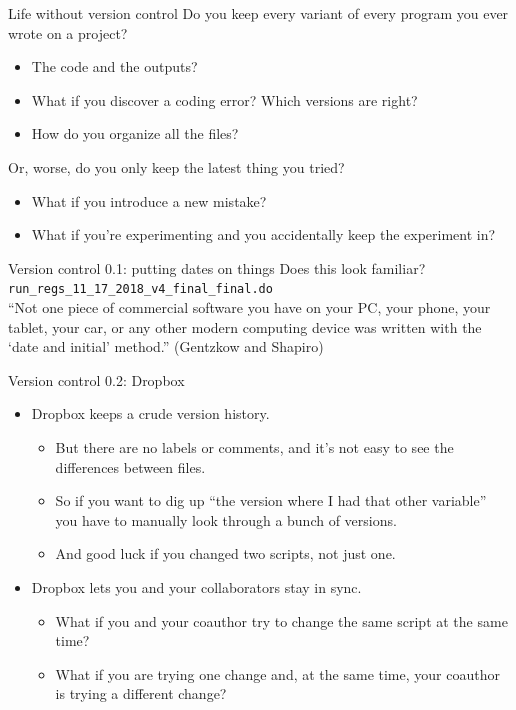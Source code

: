 \documentclass{beamer}
\begin{document}
\begin{frame}{Life without version control}
Do you keep every variant of every program you ever wrote on a project?
\begin{itemize}
\item The code and the outputs?
\item What if you discover a coding error? Which versions are right?
\item How do you organize all the files?
\end{itemize}
Or, worse, do you only keep the latest thing you tried?
\begin{itemize}
\item What if you introduce a new mistake?
\item What if you're experimenting and you accidentally keep the experiment in?
\end{itemize}
\end{frame}

\begin{frame}{Version control 0.1: putting dates on things}
Does this look familiar?
\texttt{run\_regs\_11\_17\_2018\_v4\_final\_final.do}
\\
``Not one piece of commercial software you have on your PC, your phone, your tablet,
your car, or any other modern computing device was written with the `date and initial' method.'' (Gentzkow and Shapiro)
\end{frame}

\begin{frame}{Version control 0.2: Dropbox}
\begin{itemize}
\item Dropbox keeps a crude version history.
\begin{itemize}
\item But there are no labels or comments, and it's not easy to see the differences between files.
\item So if you want to dig up ``the version where I had that other variable'' you have to manually look through a bunch of versions.
\item And good luck if you changed two scripts, not just one.
\end{itemize}
\item Dropbox lets you and your collaborators stay in sync.
\begin{itemize}
\item What if you and your coauthor try to change the same script at the same time?
\item What if you are trying one change and, at the same time, your coauthor is trying a different change?
\end{itemize}
\end{itemize}
\end{frame}
\end{document}
